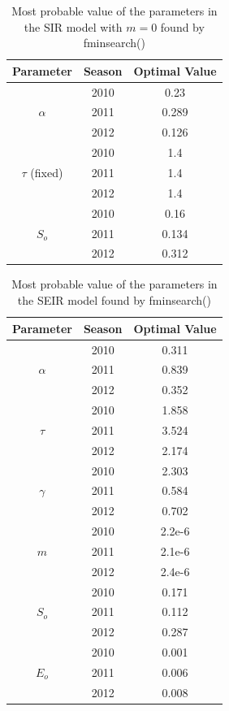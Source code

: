 \documentclass[11pt, a4paper]{article}
\begin{document}
\begin{table}[H]
\FloatBarrier
\centering
\begin{tabular}{| c | c | c |}
    \hline
    Parameter & Season & Optimal Value \\ \hline
    \multirow{3}{*}{$\alpha$} & 2010 & 0.23\\
    & 2011 & 0.289\\
    & 2012 & 0.126 \\ \hline
    \multirow{3}{*}{$\tau$ (fixed) } & 2010 & 1.4 \\ 
    & 2011 & 1.4\\
    & 2012 & 1.4\\ \hline
    \multirow{3}{*}{$S_o$} & 2010 & 0.16 \\ 
    & 2011 & 0.134 \\ 
    & 2012 & 0.312 \\ \hline
    \end{tabular}
    \caption{Most probable value of the parameters in the SIR model with $m=0$ found by fminsearch()}
    \label{tab:sir0}
\end{table}


\begin{table}[H]
\FloatBarrier
\centering
\begin{tabular}{| c | c | c |}
    \hline
    Parameter & Season & Optimal Value \\ \hline
    \multirow{3}{*}{$\alpha$} & 2010 & 0.311\\
    & 2011 & 0.839\\
    & 2012 & 0.352 \\ \hline
    \multirow{3}{*}{$\tau$} & 2010 & 1.858 \\ 
    & 2011 & 3.524\\
    & 2012 & 2.174\\ \hline
    \multirow{3}{*}{$\gamma$} & 2010 & 2.303 \\ 
    & 2011 & 0.584\\
    & 2012 & 0.702\\ \hline
    \multirow{3}{*}{$m$} & 2010 & 2.2e-6\\ 
    & 2011 & 2.1e-6 \\
    & 2012 & 2.4e-6 \\ \hline
    \multirow{3}{*}{$S_o$} & 2010 & 0.171 \\ 
    & 2011 & 0.112 \\ 
    & 2012 & 0.287 \\ \hline
    \multirow{3}{*}{$E_o$} & 2010 & 0.001 \\ 
    & 2011 & 0.006 \\ 
    & 2012 & 0.008 \\ \hline
    \end{tabular}
    \caption{Most probable value of the parameters in the SEIR model found by fminsearch()}
    \label{tab:seir}
\end{table}
\end{document}

